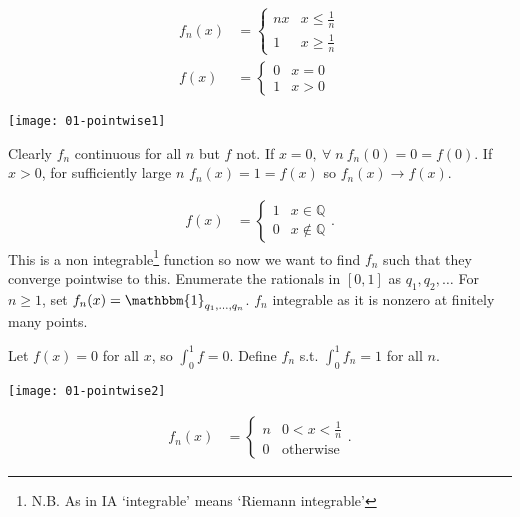     \begin{example} ~\vspace*{-1.5\baselineskip}
        \begin{align*}
            f_n(x) &= \begin{cases}
                nx & x \leq \frac{1}{n} \\
                1 & x \geq \frac{1}{n}
            \end{cases} \\
            f(x) &= \begin{cases}
                0 & x= 0 \\
                1 & x> 0
            \end{cases} 
        \end{align*} 
        {\par
            \centering 
            \texttt{[image: 01-pointwise1]} 
        \par}
        Clearly $f_n$ continuous for all $n$ but $f$ not.
        If $x = 0,\ \forall \; n \ f_n(0) = 0 = f(0)$.
        If $x > 0$, for sufficiently large $n$ $f_n(x) = 1 = f(x)$ so $f_n(x) \to f(x)$.
    \end{example} 

    \begin{example}
        \begin{align*}
            f(x) &= \begin{cases}
                1 & x \in \mathbb{Q} \\
                0 & x \notin \mathbb{Q}
            \end{cases}.
        \end{align*} 
        This is a non integrable\footnote{N.B. As in IA `integrable' means `Riemann integrable'} function so now we want to find $f_n$ such that they converge pointwise to this.
        Enumerate the rationals in $[0, 1]$ as $q_1, q_2, \dots$
        For $n \geq 1$, set $f_n(x) = \mathbbm{1}_{q_1, \dots, q_n}$. 
        $f_n$ integrable as it is nonzero at finitely many points.
    \end{example} 

    \begin{example}
    Let $f(x) = 0$ for all $x$, so $\int_0^1 f = 0$.
    Define $f_n$ s.t. $\int_0^1 f_n = 1$ for all $n$.
    {\par
        \centering 
        \texttt{[image: 01-pointwise2]} 
    \par}
    \begin{align*}
        f_n(x) &= \begin{cases}
            n & 0 < x < \frac{1}{n} \\
            0 & \text{otherwise}
        \end{cases}.
    \end{align*} 
    \end{example} 

